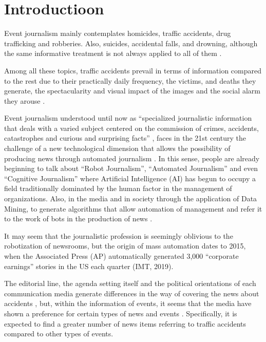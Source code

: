 \section{Introductioon}\label{sec-introduction}

Event journalism mainly contemplates homicides, traffic accidents, drug
trafficking and robberies. Also, suicides, accidental falls, and
drowning, although the same informative treatment is not always applied
to all of them \cite{olivar2020tratamiento}.

Among all these topics, traffic accidents prevail in terms of
information compared to the rest due to their practically daily
frequency, the victims, and deaths they generate, the spectacularity and
visual impact of the images and the social alarm they arouse
\cite{rodriguez2011informacion}.

Event journalism understood until now as \enquote{specialized journalistic
information that deals with a varied subject centered on the commission
of crimes, accidents, catastrophes and curious and surprising facts}
\cite[p. 2]{rodriguez2011informacion}, faces in the 21st century the challenge
of a new technological dimension that allows the possibility of
producing news through automated journalism \cite{jamil2021automated}. In this
sense, people are already beginning to talk about \enquote{Robot Journalism},
\enquote{Automated Journalism} and even \enquote{Cognitive Journalism} where Artificial Intelligence (AI) has begun to occupy a field traditionally dominated by the human factor in the management of organizations. Also, in the media and in society through the application of Data Mining, to generate
algorithms that allow automation of management and refer it to the work
of bots in the production of news \cite{tunez2020from}.

It may seem that the journalistic profession is seemingly oblivious to
the robotization of newsrooms, but the origin of mass automation dates
to 2015, when the Associated Press (AP) automatically generated 3,000
\enquote{corporate earnings} stories in the US each quarter (IMT, 2019).

The editorial line, the agenda setting itself and the political
orientations of each communication media generate differences in the way
of covering the news about accidents \cite{arce2017accidentalidad}, but, within the information of events, it seems that the media
have shown a preference for certain types of news and events \cite{duran2020responsabilidad}. Specifically, it is expected to find a greater
number of news items referring to traffic accidents compared to other
types of events.

